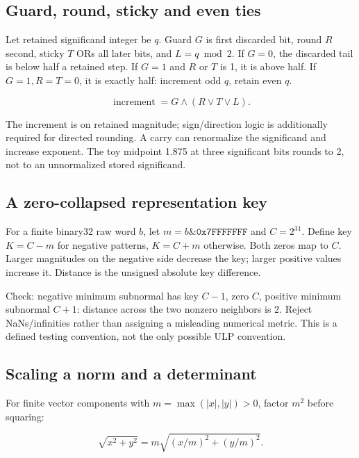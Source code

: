 \subsection{Guard, round, sticky and even ties}\label{03-visual-computing-i-ch018-guard-round-sticky-and-even-ties}

Let retained significand integer be \(q\). Guard \(G\) is first discarded bit, round \(R\) second, sticky \(T\) ORs all later bits, and \(L=q\bmod2\). If \(G=0\), the discarded tail is below half a retained step. If \(G=1\) and \(R\) or \(T\) is 1, it is above half. If \(G=1,R=T=0\), it is exactly half: increment odd \(q\), retain even \(q\).

\[
\operatorname{increment}=G\land(R\lor T\lor L).
\]

The increment is on retained magnitude; sign/direction logic is additionally required for directed rounding. A carry can renormalize the significand and increase exponent. The toy midpoint 1.875 at three significant bits rounds to 2, not to an unnormalized stored significand.

\subsection{A zero-collapsed representation key}\label{03-visual-computing-i-ch018-a-zero-collapsed-representation-key}

For a finite binary32 raw word \(b\), let \(m=b\mathbin{\&}\texttt{0x7FFFFFFF}\) and \(C=2^{31}\). Define key \(K=C-m\) for negative patterns, \(K=C+m\) otherwise. Both zeros map to \(C\). Larger magnitudes on the negative side decrease the key; larger positive values increase it. Distance is the unsigned absolute key difference.

Check: negative minimum subnormal has key \(C-1\), zero \(C\), positive minimum subnormal \(C+1\): distance across the two nonzero neighbors is 2. Reject NaNs/infinities rather than assigning a misleading numerical metric. This is a defined testing convention, not the only possible ULP convention.

\subsection{Scaling a norm and a determinant}\label{03-visual-computing-i-ch018-scaling-a-norm-and-a-determinant}

For finite vector components with \(m=\max(|x|,|y|)>0\), factor \(m^2\) before squaring:

\[
\sqrt{x^2+y^2}=m\sqrt{(x/m)^2+(y/m)^2}.
\]

